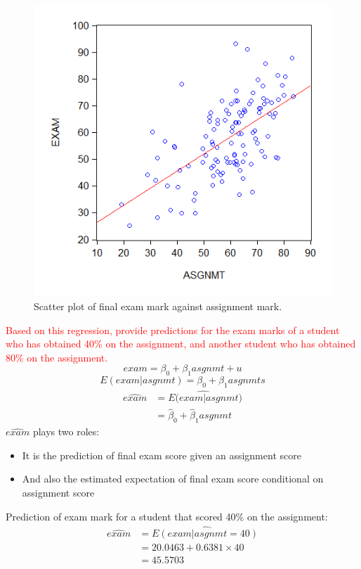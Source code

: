 \documentclass[12pt]{report}
\begin{document}
\vspace{-\baselineskip}
\begin{figure}[H]
	\centering
	\includegraphics{q1_21}
	\caption{Scatter plot of final exam mark against assignment mark.}
\end{figure}
\vspace{-\baselineskip}
\noindent \textcolor{red}
{
	Based on this regression, provide predictions for the exam marks of a student who has obtained 40\% on the assignment, and another student who has obtained 80\% on the assignment.
}
$$exam = \beta_0 + \beta_1 asgnmt + u$$ $$E(exam|asgnmt) = \beta_0 + \beta_1 asgnmts$$
\begin{align*}
	\widehat{exam} &= \widehat{E(exam|asgnmt}) \\
	&= \hat{\beta}_0 + \hat{\beta}_1 asgnmt
\end{align*}
\noindent $\widehat{exam}$ plays two roles: 
\begin{itemize}
	\item It is the prediction of final exam score given an assignment score
	\item And also the estimated expectation of final exam score conditional on assignment score
\end{itemize}

\noindent Prediction of exam mark for a student that scored 40\% on the assignment:
\begin{align*}
	\widehat{exam} &= \widehat{E(exam|asgnmt = 40)} \\
	&= 20.0463 + 0.6381{\times}40 \\
	&= 45.5703
\end{align*}
\end{document}
